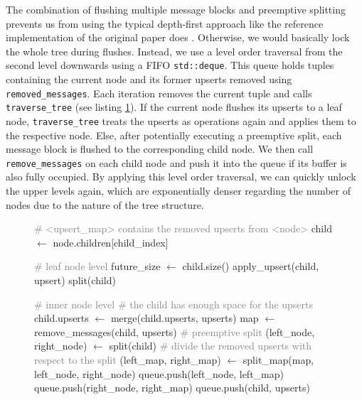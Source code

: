 The combination of flushing multiple message blocks and preemptive splitting prevents us from using the typical depth-first approach like the reference implementation of the original paper does \cite{reference_b_epsilon_tree}. Otherwise, we would basically lock the whole tree during flushes. Instead, we use a level order traversal from the second level downwards using a FIFO \texttt{std::deque}. This queue holds tuples containing the current node and its former upserts removed using \texttt{removed\_messages}. Each iteration removes the current tuple and calls \texttt{traverse\_tree} (see listing \ref{fig:level_order_traversal}). If the current node flushes its upserts to a leaf node, \texttt{traverse\_tree} treats the upserts as operations again and applies them to the respective node. Else, after potentially executing a preemptive split, each message block is flushed to the corresponding child node.\newline
We then call \texttt{remove\_messages} on each child node and push it into the queue if its buffer is also fully occupied. By applying this level order traversal, we can quickly unlock the upper levels again, which are exponentially denser regarding the number of nodes due to the nature of the tree structure.

\begin{figure}[h]
	\label{fig:level_order_traversal}
	\vspace*{5mm}
	\begin{algorithmic}[1]
		\State \textcolor{gray}{\# <upsert\_map> contains the removed upserts from <node>}
		\State child $\leftarrow$ node.children[child\_index]
		
		\State \textcolor{gray}{\# leaf node level}
		\State future\_size $\leftarrow$ child.size()
		\State apply\_upsert(child, upsert)
		\State split(child)
		\EndIf
		\EndFor
		
		\Else
		\State \textcolor{gray}{\# inner node level}
		\State \textcolor{gray}{\# the child has enough space for the upserts}
		\State child.upserts $\leftarrow$ merge(child.upserts, upserts)
		\Else
		\State map $\leftarrow$ remove\_messages(child, upserts)
		\State \textcolor{gray}{\# preemptive split}
		\State (left\_node, right\_node) $\leftarrow$ split(child)
		\State \textcolor{gray}{\# divide the removed upserts with respect to the split}
		\State (left\_map, right\_map) $\leftarrow$ split\_map(map, left\_node, right\_node)
		\State queue.push(left\_node, left\_map)
		\State queue.push(right\_node, right\_map)
		\Else
		\State queue.push(child, upserts)
		\EndIf 
		\EndIf
		\EndIf
		\EndFor
		\EndFunction
		\newline
	\end{algorithmic}
\end{figure}

